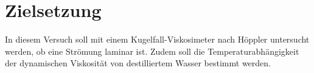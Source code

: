 \section{Zielsetzung}
\label{sec:Zielsetzung}
In diesem Versuch soll mit einem Kugelfall-Viskosimeter nach Höppler untersucht
werden, ob eine Strömung laminar ist. Zudem soll die Temperaturabhängigkeit der
dynamischen Viskosität von destilliertem Wasser bestimmt werden.
